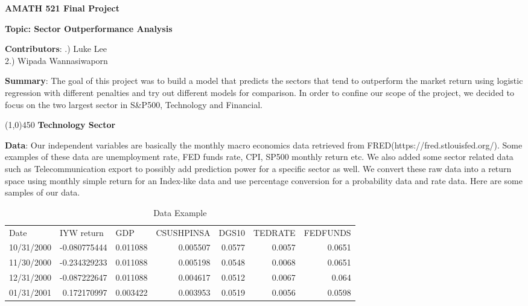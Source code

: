 \documentclass[12pt]{amsart}
\begin{document}
{\bf \Large AMATH 521 Final Project}\\
\begin{center}
{\bf \Large Topic: Sector Outperformance Analysis}\\
\end{center}
\vskip 16pt \noindent
{\textbf{Contributors}: }
\vskip 8pt .) Luke Lee\\
2.) Wipada Wannasiwaporn

\vskip 8pt \noindent
{\textbf{Summary}: }
\vskip 8pt \noindent
The goal of this project was to build a model that predicts the sectors that tend to outperform the market return using logistic regression with different penalties and try out different models for comparison. In order to confine our scope of the project, we decided to focus on the two largest sector in S\&P500, Technology and Financial. 

\begin{center}
	\line(1,0){450}
	\vskip 8pt \noindent
	{\bf Technology Sector}
\end{center}
\vskip 8pt \noindent
{\textbf{Data}: }
\vskip 8pt \noindent
Our independent variables are basically the monthly macro economics data retrieved from FRED(https://fred.stlouisfed.org/). Some examples of these data are unemployment 
rate, FED funds rate, CPI, SP500 monthly return etc. We also added some sector related data such as Telecommunication export to possibly add prediction power for a specific sector as well. We convert these raw data into a return space using monthly simple return for an Index-like data and use percentage conversion for a probability data and rate data. Here are some samples of our data.\\

\begin{table}[htbp]
	\centering
	\caption{Data Example}
	\begin{tabular}{rrrrrrr}
		\multicolumn{1}{l}{Date} & \multicolumn{1}{l}{IYW return} & \multicolumn{1}{l}{GDP} & \multicolumn{1}{l}{CSUSHPINSA} & \multicolumn{1}{l}{DGS10} & \multicolumn{1}{l}{TEDRATE} & \multicolumn{1}{l}{FEDFUNDS} \\
		10/31/2000 & -0.080775444 & 0.011088 & 0.005507 & 0.0577 & 0.0057 & 0.0651 \\
		11/30/2000 & -0.234329233 & 0.011088 & 0.005198 & 0.0548 & 0.0068 & 0.0651 \\
		12/31/2000 & -0.087222647 & 0.011088 & 0.004617 & 0.0512 & 0.0067 & 0.064 \\
		01/31/2001 & 0.172170997 & 0.003422 & 0.003953 & 0.0519 & 0.0056 & 0.0598 \\
	\end{tabular}%
	\label{tab:addlabel}%
\end{table}%
\vskip 8pt \noindent
\end{document}
